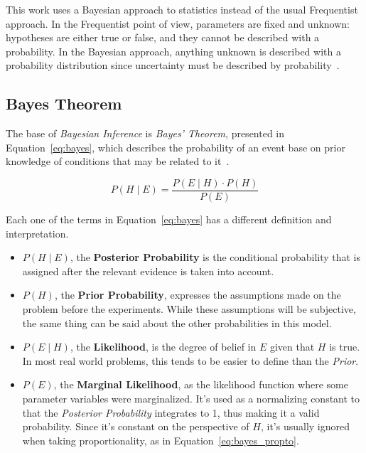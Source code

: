 This work uses a Bayesian approach to statistics instead of the usual Frequentist approach. In the Frequentist point of view, parameters are fixed and unknown: hypotheses are either true or false, and they cannot be described with a probability. In the Bayesian approach, anything unknown is described with a probability distribution since uncertainty must be described by probability~\cite{mackay}.

\subsection{Bayes Theorem}

The base of \emph{Bayesian Inference} is \emph{Bayes' Theorem}, presented in Equation~\ref{eq:bayes}, which describes the probability of an event base on prior knowledge of conditions that may be related to it~\cite{gelman2003}.

\begin{equation}
\label{eq:bayes}
	P \left( H \mid E \right) = \frac{P \left( E \mid H \right) \cdot P \left( H \right)}{P \left( E \right)}
\end{equation}

Each one of the terms in Equation~\ref{eq:bayes} has a different definition and interpretation.

\begin{itemize}
	\item $P \left( H \mid E \right)$, the \textbf{Posterior Probability} is the conditional probability that is assigned after the relevant evidence is taken into account.
	\item $P \left( H \right)$, the \textbf{Prior Probability}, expresses the assumptions made on the problem before the experiments. While these assumptions will be subjective, the same thing can be said about the other probabilities in this model.
	\item $P \left( E \mid H \right)$, the \textbf{Likelihood}, is the degree of belief in $E$ given that $H$ is true. In most real world problems, this tends to be easier to define than the \emph{Prior}.
	\item $P \left( E \right)$, the \textbf{Marginal Likelihood}, as the likelihood function where some parameter variables were marginalized. It's used as a normalizing constant to that the \emph{Posterior Probability} integrates to 1, thus making it a valid probability. Since it's constant on the perspective of $H$, it's usually ignored when taking proportionality, as in Equation~\ref{eq:bayes_propto}.
\end{itemize}

